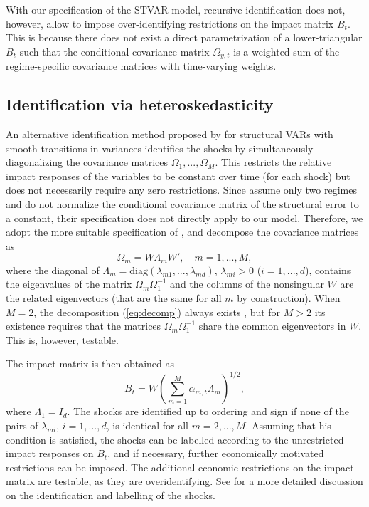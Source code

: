 \documentclass[nojss]{jss}
\begin{document}
With our specification of the STVAR model, recursive identification does not, however, allow to impose over-identifying restrictions on the impact matrix $B_t$. This is because there does not exist a direct parametrization of a lower-triangular $B_t$ such that the conditional covariance matrix $\Omega_{y,t}$ is a weighted sum of the regime-specific covariance matrices with time-varying weights.

\subsection{Identification via heteroskedasticity}

An alternative identification method proposed by \cite{Lutkepohl+Netsunajev:2017} for structural VARs with smooth transitions in variances \citep[see also the seminal paper by][]{Rigobon:2003} identifies the shocks by simultaneously diagonalizing the covariance matrices $\Omega_1,...,\Omega_M$. This restricts the relative impact responses of the variables to be constant over time (for each shock) but does not necessarily require any zero restrictions. Since \cite{Lutkepohl+Netsunajev:2017} assume only two regimes and do not normalize the conditional covariance matrix of the structural error to a constant, their specification does not directly apply to our model. Therefore, we adopt the more suitable specification of \cite{Virolainen:2025}, and decompose the covariance matrices as
\begin{equation}\label{eq:decomp}
\Omega_m=W\Lambda_mW', \quad m=1,...,M,
\end{equation}
where the diagonal of $\Lambda_m=\text{diag}(\lambda_{m1},...,\lambda_{md})$, $\lambda_{mi}>0$ ($i=1,...,d$), contains the eigenvalues of the matrix $\Omega_m\Omega_1^{-1}$ and the columns of the nonsingular $W$ are the related eigenvectors (that are the same for all $m$ by construction). When $M=2$, the decomposition (\ref{eq:decomp}) always exists \citep[Theorem A9.9]{Muirhead:1982}, but for $M>2$ its existence requires that the matrices $\Omega_m\Omega_1^{-1}$ share the common eigenvectors in $W$. This is, however, testable.

The impact matrix is then obtained as
\begin{equation}
B_t=W\left(\sum_{m=1}^M\alpha_{m,t}\Lambda_m\right)^{1/2},
\end{equation}
where $\Lambda_1=I_d$. The shocks are identified up to ordering and sign if none of the pairs of $\lambda_{mi}$, $i=1,...,d$, is identical for all $m=2,...,M$. Assuming that his condition is satisfied, the shocks can be labelled according to the unrestricted impact responses on $B_t$, and if necessary, further economically motivated restrictions can be imposed. The additional economic restrictions on the impact matrix are testable, as they are overidentifying. See \cite{Virolainen:2025} for a more detailed discussion on the identification and labelling of the shocks.
\end{document}

